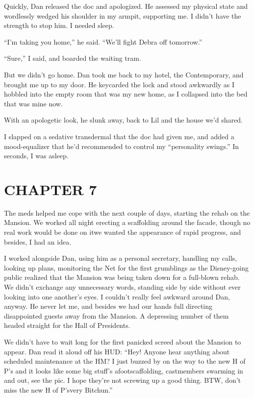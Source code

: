Quickly, Dan released the doc and apologized. He assessed my
physical state and wordlessly wedged his shoulder in my armpit,
supporting me. I didn't have the strength to stop him. I needed
sleep.

“I'm taking you home,” he said. “We'll fight Debra off tomorrow.”

“Sure,” I said, and boarded the waiting tram.

But we didn't go home. Dan took me back to my hotel, the
Contemporary, and brought me up to my door. He keycarded the lock
and stood awkwardly as I hobbled into the empty room that was my
new home, as I collapsed into the bed that was mine now.

With an apologetic look, he slunk away, back to Lil and the house
we'd shared.

I slapped on a sedative transdermal that the doc had given me, and
added a mood-equalizer that he'd recommended to control my
“personality swings.” In seconds, I was asleep.

\section{CHAPTER 7}

The meds helped me cope with the next couple of days, starting the
rehab on the Mansion. We worked all night erecting a scaffolding
around the facade, though no real work would be done on it{\dash}we
wanted the appearance of rapid progress, and besides, I had an
idea.

I worked alongside Dan, using him as a personal secretary, handling
my calls, looking up plans, monitoring the Net for the first
grumblings as the Disney-going public realized that the Mansion was
being taken down for a full-blown rehab. We didn't exchange any
unnecessary words, standing side by side without ever looking into
one another's eyes. I couldn't really feel awkward around Dan,
anyway. He never let me, and besides we had our hands full
directing disappointed guests away from the Mansion. A depressing
number of them headed straight for the Hall of Presidents.

We didn't have to wait long for the first panicked screed about the
Mansion to appear. Dan read it aloud off his HUD: “Hey! Anyone hear
anything about scheduled maintenance at the HM? I just buzzed by on
the way to the new H of P's and it looks like some big stuff's
afoot{\dash}scaffolding, castmembers swarming in and out, see the pic. I
hope they're not screwing up a good thing. BTW, don't miss the new
H of P's{\dash}very Bitchun.”


